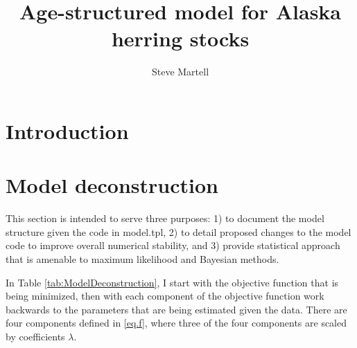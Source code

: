 \documentclass[12pt,letterpaper]{article}
\title{Age-structured model for Alaska herring stocks}
\author{Steve Martell}
\begin{document}
  \maketitle

  \begin{abstract}
    

  \end{abstract}


  \section{Introduction} %
  \label{sec:introduction}

  

  \section{Model deconstruction} %
  \label{sec:model_deconstruction}
  This section is intended to serve three purposes: 1) to document the model structure given the code in model.tpl,  2) to detail proposed changes to the model code to improve overall numerical stability, and 3) provide statistical approach that is amenable to maximum likelihood and Bayesian methods.

  In Table \ref{tab:ModelDeconstruction}, I start with the objective function that is being minimized, then with each component of the objective function work backwards to the parameters that are being estimated given the data. There are four components defined in \eqref{eq.f}, where three of the four components are scaled by coefficients $\lambda$.
\end{document}

